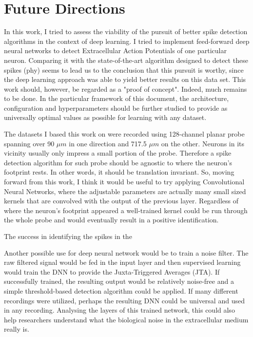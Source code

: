 \label{cap:conclusions}

\section{Future Directions}
In this work, I tried to assess the viability of the pursuit of better spike detection algorithms in the context of deep learning. I tried to implement feed-forward deep neural networks to detect Extracellular Action Potentials of one particular neuron. Comparing it with the state-of-the-art algorithm designed to detect these spikes (phy) seems to lead us to the conclusion that this pursuit is worthy, since the deep learning approach was able to yield better results on this data set. This work should, however, be regarded as a "proof of concept". Indeed, much remains to be done. In the particular framework of this document, the architecture, configuration and hyperparameters should be further studied to provide as universally optimal values as possible for learning with any dataset.

The datasets I based this work on were recorded using 128-channel planar probe spanning over 90 $\mu m$ in one direction and 717.5 $\mu m$ on the other. Neurons in its vicinity usually only impress a small portion of the probe. Therefore a spike detection algorithm for such probe should be agnostic to where the neuron's footprint rests. In other words, it should be translation invariant. So, moving forward from this work, I think it would be useful to try applying Convolutional Neural Networks, where the adjustable parameters are actually many small sized kernels that are convolved with the output of the previous layer. Regardless of where the neuron's footprint appeared a well-trained kernel could be run through the whole probe and would eventually result in a positive identification.

The success in identifying the spikes in the 

Another possible use for deep neural network would be to train a noise filter. The raw filtered signal would be fed in the input layer and then supervised learning would train the DNN to provide the Juxta-Triggered Averages (JTA). If successfully trained, the resulting output would be relatively noise-free and a simple threshold-based detection algorithm could be applied. If many different recordings were utilized, perhaps the resulting DNN could be universal and used in any recording. Analysing the layers of this trained network, this could also help researchers understand what the biological noise in the extracellular medium really is.

\cleardoublepage
